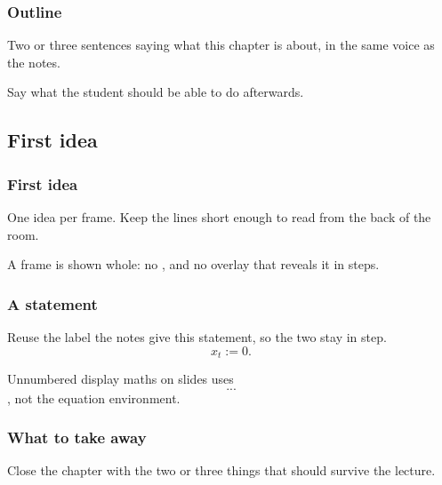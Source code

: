 %   

\begin{frame}
  \frametitle{Outline}
\nocite{Bou18tra}
\nocite{CJP15alg}
Two or three sentences saying what this chapter is about,
in the same voice as the notes.

Say what the student should be able to do afterwards.
\end{frame}

\subsection{First idea}

\begin{frame}
  \frametitle{First idea}
One idea per frame.
Keep the lines short enough to read from the back of the room.

A frame is shown whole:
no \pause, and no overlay that reveals it in steps.
\end{frame}

\begin{frame}
  \frametitle{A statement}
\begin{defi}
\label{def.something}
Reuse the label the notes give this statement,
so the two stay in step.
\[
x_t := 0.
\]
\end{defi}

Unnumbered display maths on slides uses \[ ... \],
not the equation environment.
\end{frame}

\begin{frame}
  \frametitle{What to take away}
Close the chapter with the two or three things
that should survive the lecture.
\end{frame}

